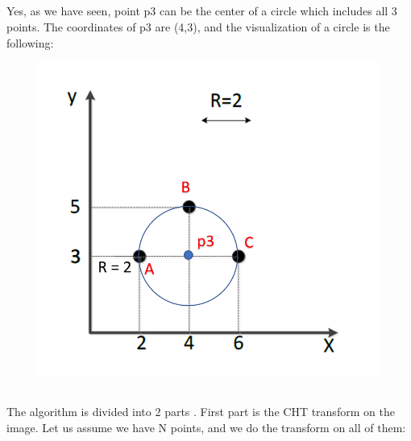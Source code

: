 \documentclass[a4paper]{iacas}
\begin{document}
\subsection{}
Yes, as we have seen, point p3 can be the center of a circle which includes all 3 points. The coordinates of p3 are (4,3), and the visualization of a circle is the following:
\begin{figure}[h!]
\includegraphics[scale=0.7]{imgs/q1_4.png}
\end{figure}


\subsection{}

The algorithm is divided into 2 parts . First part is the CHT transform on the image. Let us assume we have N points, and we do the transform on all of them:
\newpage
{}
\begin{algorithmic}[1]
\STATE {} 
	\ENDFOR
\ENDFOR
\end{algorithmic}
\end{document}
